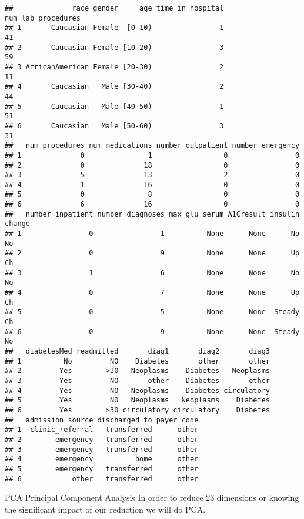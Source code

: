 \documentclass[]{article}
\begin{document}
\begin{verbatim}
##              race gender     age time_in_hospital num_lab_procedures
## 1       Caucasian Female  [0-10)                1                 41
## 2       Caucasian Female [10-20)                3                 59
## 3 AfricanAmerican Female [20-30)                2                 11
## 4       Caucasian   Male [30-40)                2                 44
## 5       Caucasian   Male [40-50)                1                 51
## 6       Caucasian   Male [50-60)                3                 31
##   num_procedures num_medications number_outpatient number_emergency
## 1              0               1                 0                0
## 2              0              18                 0                0
## 3              5              13                 2                0
## 4              1              16                 0                0
## 5              0               8                 0                0
## 6              6              16                 0                0
##   number_inpatient number_diagnoses max_glu_serum A1Cresult insulin change
## 1                0                1          None      None      No     No
## 2                0                9          None      None      Up     Ch
## 3                1                6          None      None      No     No
## 4                0                7          None      None      Up     Ch
## 5                0                5          None      None  Steady     Ch
## 6                0                9          None      None  Steady     No
##   diabetesMed readmitted       diag1       diag2       diag3
## 1          No         NO    Diabetes       other       other
## 2         Yes        >30   Neoplasms    Diabetes   Neoplasms
## 3         Yes         NO       other    Diabetes       other
## 4         Yes         NO   Neoplasms    Diabetes circulatory
## 5         Yes         NO   Neoplasms   Neoplasms    Diabetes
## 6         Yes        >30 circulatory circulatory    Diabetes
##   admission_source discharged_to payer_code
## 1  clinic_referral   transferred      other
## 2        emergency   transferred      other
## 3        emergency   transferred      other
## 4        emergency          home      other
## 5        emergency   transferred      other
## 6            other   transferred      other
\end{verbatim}

PCA Principal Component Analysis In order to reduce 23 dimensions or
knowing the significant impact of our reduction we will do PCA.
\end{document}
